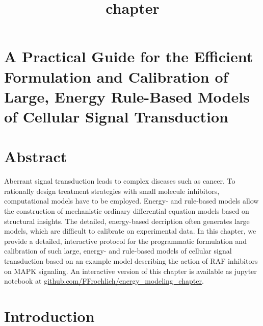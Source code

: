 \documentclass[11pt]{article}
\title{chapter}
\begin{document}
    
    \maketitle
    
    

    
    \hypertarget{a-practical-guide-for-the-efficient-formulation-and-calibration-of-large-energy-rule-based-models-of-cellular-signal-transduction}{%
\section{A Practical Guide for the Efficient Formulation and Calibration
of Large, Energy Rule-Based Models of Cellular Signal
Transduction}\label{a-practical-guide-for-the-efficient-formulation-and-calibration-of-large-energy-rule-based-models-of-cellular-signal-transduction}}

    \hypertarget{abstract}{%
\section{Abstract}\label{abstract}}

    Aberrant signal transduction leads to complex diseases such as cancer.
To rationally design treatment strategies with small molecule
inhibitors, computational models have to be employed. Energy- and
rule-based models allow the construction of mechanistic ordinary
differential equation models based on structural insights. The detailed,
energy-based decription often generates large models, which are
difficult to calibrate on experimental data. In this chapter, we provide
a detailed, interactive protocol for the programmatic formulation and
calibration of such large, energy- and rule-based models of cellular
signal transduction based on an example model describing the action of
RAF inhibitors on MAPK signaling. An interactive version of this chapter
is available as jupyter notebook at
\href{https:://github.com/FFroehlich/energy_modeling_chapter}{github.com/FFroehlich/energy\_modeling\_chapter}.

    \hypertarget{introduction}{%
\section{Introduction}\label{introduction}}
\end{document}
